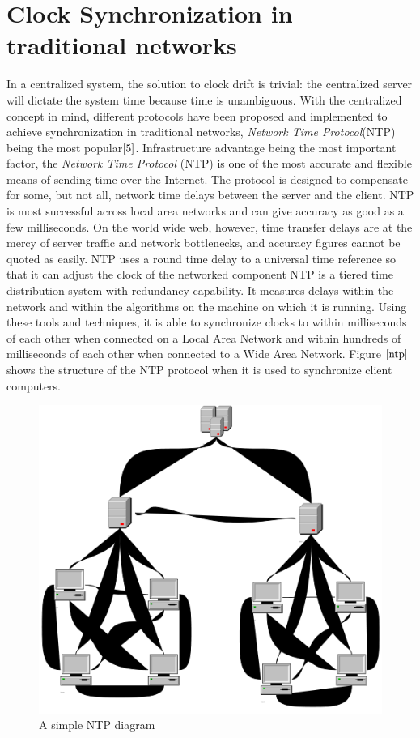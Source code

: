 \documentclass[a4paper,10pt]{report}
\begin{document}
\section{\textbf{Clock Synchronization in traditional networks}}
\noindent In a centralized system, the solution to clock drift is
trivial: the centralized server will dictate the system time because
time is unambiguous. With the centralized concept in mind, different
protocols have been proposed and implemented to achieve
synchronization in traditional networks, \textit{Network Time
Protocol}(NTP) being the most popular$\cite{5}$. \newline
Infrastructure advantage being the most important factor, the
\emph{Network Time Protocol} (NTP) is one of the most accurate and
flexible means of sending time over the Internet. The protocol is
designed to compensate for some, but not all, network time delays
between the server and the client. NTP is most successful across
local area networks and can give accuracy as good as a few
milliseconds. On the world wide web, however, time transfer delays
are at the mercy of server traffic and network bottlenecks, and
accuracy figures cannot be quoted as easily. NTP uses a round time
delay to a universal time reference so that it can adjust the clock
of the networked component NTP is a tiered time distribution system
with redundancy capability. It measures delays within the network
and within the algorithms on the machine on which it is running.
Using these tools and techniques, it is able to synchronize clocks
to within milliseconds of each other when connected on a Local Area
Network and within hundreds of milliseconds of each other when
connected to a Wide Area Network. Figure $\ref{ntp}$ shows the
structure of the NTP protocol when it is used to synchronize client
computers.
\begin{figure}[!h]
\centering
\includegraphics[width= 0.5 \textwidth]{ntp}
\caption{A simple NTP diagram} \label{ntp}
\end{figure}\newline
\end{document}
